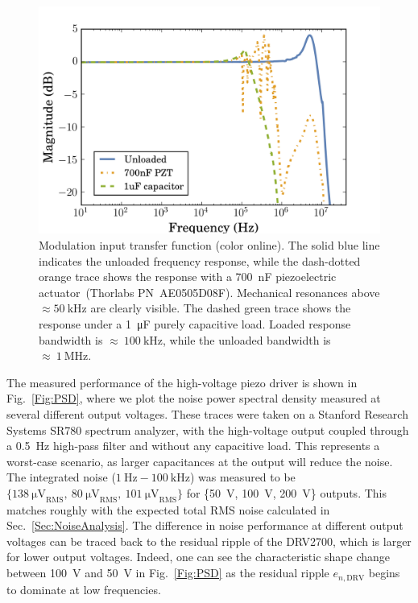 \documentclass[aip,rsi,reprint]{revtex4-1} %
\begin{document}
\begin{figure}[t]
\includegraphics[width=\columnwidth]{fig/PiezoModulationTransfer.png}
\caption{Modulation input transfer function (color online). The solid blue line indicates the unloaded frequency response, while the dash-dotted orange trace shows the response with a \SI{700}{\nano\farad} piezoelectric actuator~{(Thorlabs PN~AE0505D08F)}. Mechanical resonances above $\approx\SI{50}{\kilo\hertz}$ are clearly visible. The dashed green trace shows the response under a \SI{1}{\micro\farad} purely capacitive load. Loaded response bandwidth is $\approx~\SI{100}{\kilo\hertz}$, while the unloaded bandwidth is $\approx~\SI{1}{\mega\hertz}$.\label{Fig:TransferFunc}}
\end{figure}

The measured performance of the high-voltage piezo driver is shown in Fig.~\ref{Fig:PSD}, where we plot the noise power spectral density measured at several different output voltages.
These traces were taken on a Stanford Research Systems SR780 spectrum analyzer, with the high-voltage output coupled through a \SI{0.5}{\hertz} high-pass filter and without any capacitive load.
This represents a worst-case scenario, as larger capacitances at the output will reduce the noise.
The integrated noise ($\SI{1}{\hertz} - \SI{100}{\kilo\hertz}$) was measured to be $\{\SI{138}{\micro\volt}_\text{RMS},~\SI{80}{\micro\volt}_\text{RMS},~\SI{101}{\micro\volt}_\text{RMS}\}$ for \{\SI{50}{\volt}, \SI{100}{\volt}, \SI{200}{\volt}\} outputs. 
This matches roughly with the expected total RMS noise calculated in Sec.~\ref{Sec:NoiseAnalysis}.
The difference in noise performance at different output voltages can be traced back to the residual ripple of the DRV2700, which is larger for lower output voltages.
Indeed, one can see the characteristic shape change between \SI{100}{\volt} and \SI{50}{\volt} in Fig.~\ref{Fig:PSD} as the residual ripple $e_{n,\text{DRV}}$ begins to dominate at low frequencies.
\end{document}
